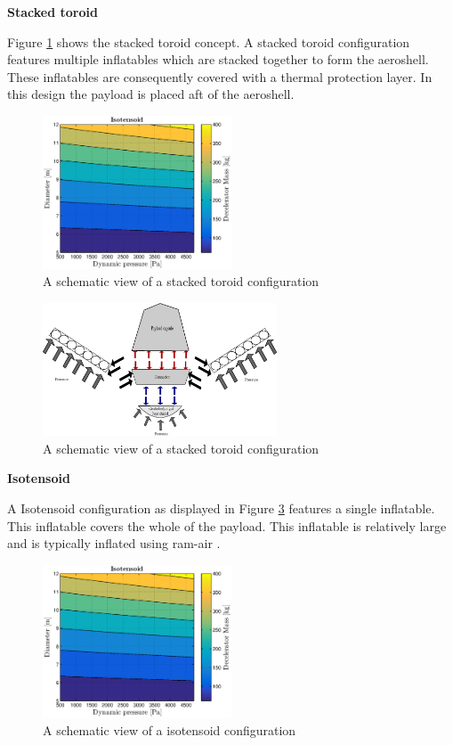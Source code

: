 \textbf{Stacked toroid}

Figure \ref{fig:conc_stacked} shows the stacked toroid concept. A stacked toroid configuration features multiple inflatables which are stacked together to form the aeroshell. These inflatables are consequently covered with a thermal protection layer. In this design the payload is placed aft of the aeroshell.\

\begin{figure}[H]
\centering
\includegraphics[width = 0.5\textwidth]{Figure/ISO_comp.eps}
\caption{A schematic view of a stacked toroid configuration}
\label{fig:conc_stacked}
\end{figure}

\begin{figure}[H]
\centering
\includegraphics[width = 0.62\textwidth]{Figure/FBD_stacked.eps}
\caption{A schematic view of a stacked toroid configuration}
\label{fig:fbd_stacked}
\end{figure}


\textbf{Isotensoid}

A Isotensoid configuration as displayed in Figure \ref{fig:conc_iso} features a single inflatable. This inflatable covers the whole of the payload. This inflatable is relatively large and is typically inflated using ram-air \cite{Smith2011}. 

\begin{figure}[H]
\centering
\includegraphics[width = 0.5\textwidth]{Figure/ISO_comp.eps}
\caption{A schematic view of a isotensoid configuration}
\label{fig:conc_iso}
\end{figure}

